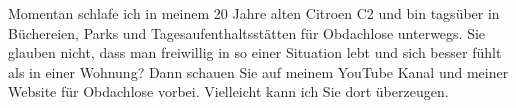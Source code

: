 		Momentan schlafe ich in meinem 20 Jahre alten Citroen C2 und bin tagsüber in Büchereien, Parks und Tagesaufenthaltsstätten für Obdachlose unterwegs.
		Sie glauben nicht, dass man freiwillig in so einer Situation lebt und sich besser fühlt als in einer Wohnung?
		Dann schauen Sie auf meinem YouTube Kanal  und meiner Website für Obdachlose  vorbei.
		Vielleicht kann ich Sie dort überzeugen.